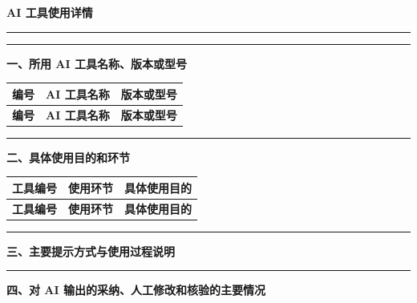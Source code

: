 \documentclass[UTF8,a4paper,11pt]{ctexart}
\newcommand{\sectiontitle}[1]{%
  \par\vspace{0.65em}\noindent
  \begingroup\setlength{\fboxsep}{7pt}%
  \colorbox{sectionbg}{\parbox{\dimexpr\textwidth-2\fboxsep\relax}{%
    \textcolor{accent}{\rule{3pt}{1.15em}\hspace{0.65em}\bfseries\zihao{-3}#1}}}%
  \endgroup\par\vspace{0.5em}}
\begin{document}
\color{bodytext}

\begin{center}
  {\bfseries\color{accent}AI 工具使用详情}\par
  \vspace{0.3em}
  {\color{rulegray}\rule{0.28\textwidth}{0.7pt}}
\end{center}

\sectiontitle{一、所用 AI 工具名称、版本或型号}
\begin{longtable}{@{}L{2.1cm}L{6.2cm}L{7.1cm}@{}}
\toprule
{}\textcolor{accent}{\textbf{编号}} & \textcolor{accent}{\textbf{AI 工具名称}} & \textcolor{accent}{\textbf{版本或型号}} \\
\midrule
\endfirsthead
\toprule
{}\textcolor{accent}{\textbf{编号}} & \textcolor{accent}{\textbf{AI 工具名称}} & \textcolor{accent}{\textbf{版本或型号}} \\
\midrule
\endhead
\bottomrule
\end{longtable}

\sectiontitle{二、具体使用目的和环节}
\begin{longtable}{@{}L{3.0cm}L{4.2cm}L{8.2cm}@{}}
\toprule
{}\textcolor{accent}{\textbf{工具编号}} & \textcolor{accent}{\textbf{使用环节}} & \textcolor{accent}{\textbf{具体使用目的}} \\
\midrule
\endfirsthead
\toprule
{}\textcolor{accent}{\textbf{工具编号}} & \textcolor{accent}{\textbf{使用环节}} & \textcolor{accent}{\textbf{具体使用目的}} \\
\midrule
\endhead
\bottomrule
\end{longtable}

\sectiontitle{三、主要提示方式与使用过程说明}

\sectiontitle{四、对 AI 输出的采纳、人工修改和核验的主要情况}
\end{document}

